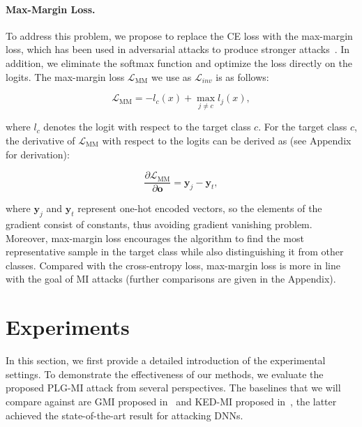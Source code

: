 \documentclass[letterpaper]{article} %
\begin{document}
\paragraph{Max-Margin Loss.}
To address this problem, we propose to replace the CE loss with the max-margin loss, which has been used in adversarial attacks to produce stronger attacks~\cite{carlini2017towards, sriramanan2020guided}. In addition, we eliminate the softmax function and optimize the loss directly on the logits. The max-margin loss $\mathcal{L}_\text{MM}$ we use as $\mathcal{L}_{inv}$ is as follows:
\begin{linenomath*}
\begin{equation}\label{eq:maximum_margin_loss}
\mathcal{L}_\text{MM} = -l_{c}(x) + \max_{j \neq c}l_{j}(x),
\end{equation}
\end{linenomath*}
where $l_{c}$ denotes the logit with respect to the target class $c$. For the target class $c$, the derivative of $\mathcal{L}_\text{MM}$ with respect to the logits can be derived as (see Appendix for derivation):
\begin{linenomath*}
\begin{equation}
\frac{\partial \mathcal{L}_\text{MM}}{\partial \mathbf{o}}=\mathbf{y}_{j}-\mathbf{y}_{t},
\end{equation}
\end{linenomath*}
where $\mathbf{y}_{j}$ and $\mathbf{y}_{t}$ represent one-hot encoded vectors, so the elements of the gradient consist of constants, thus avoiding gradient vanishing problem. Moreover, max-margin loss encourages the algorithm to find the most representative sample in the target class while also distinguishing it from other classes. Compared with the cross-entropy loss, max-margin loss is more in line with the goal of MI attacks (further comparisons are given in the Appendix).


\section{Experiments}\label{sec:experiment}
In this section, we first provide a detailed introduction of the experimental settings. To demonstrate the effectiveness of our methods, we evaluate the proposed PLG-MI attack from several perspectives. The baselines that we will compare against are GMI proposed in~\cite{zhang2020secret} and KED-MI proposed in~\cite{chen2021knowledge}, the latter achieved the state-of-the-art result for attacking DNNs.
\end{document}
